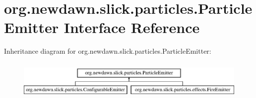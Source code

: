 \hypertarget{interfaceorg_1_1newdawn_1_1slick_1_1particles_1_1_particle_emitter}{}\section{org.\+newdawn.\+slick.\+particles.\+Particle\+Emitter Interface Reference}
\label{interfaceorg_1_1newdawn_1_1slick_1_1particles_1_1_particle_emitter}
Inheritance diagram for org.\+newdawn.\+slick.\+particles.\+Particle\+Emitter\+:\begin{figure}[H]
\begin{center}
\leavevmode
\includegraphics[height=1.917808cm]{interfaceorg_1_1newdawn_1_1slick_1_1particles_1_1_particle_emitter}
\end{center}
\end{figure}
